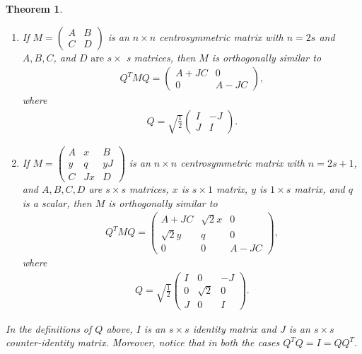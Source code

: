 \documentclass[12pt]{amsart}
\theoremstyle{plain}
\newtheorem{Thm}{Theorem}[section]
\theoremstyle{definition}
\begin{document}
\begin{Thm}\cite[Theorem 9]{weaver1985centrosymmetric}\label{orthogonal}
 \begin{enumerate}[label=(\alph*)]
     \item  If $M=\left(\begin{array}{ll}A & B \\ C & D\end{array}\right)$ is an $n \times n$ centrosymmetric matrix with $n=2s$ and $A, B, C$, and $D \text{ are } s\times$ s matrices, then $M$ is orthogonally similar to
     \begin{align*}
         Q^T M Q=\left(\begin{array}{cc}
    A+J C & 0 \\
    0 & A-J C
\end{array}\right),
     \end{align*}
     where 
     \begin{align*}
         Q  =  \sqrt{\frac{1}{2}}\left(\begin{array}{ll}I & -J \\ J & I\end{array}\right).
     \end{align*}

     \item If $M=\left(\begin{array}{lll}A & x & B \\ y & q & yJ \\ C & Jx & D\end{array}\right)$ is an $n \times n$ centrosymmetric matrix with $n =2s+1$, and $A, B, C, D$  are  $s \times s$ matrices, $x$ is $s \times 1$ matrix, $y$ is $1 \times s$ matrix, and $q$ is a scalar, then $M$ is orthogonally similar to
     \begin{align*}
         Q^{T} M Q=\left(\begin{array}{ccc}
			A+J C & \sqrt{2} x & 0 \\
			\sqrt{2} y & q & 0 \\
			0 & 0 & A-J C
		\end{array}\right),
     \end{align*}
		where
  \begin{align*}
      Q  =  \sqrt{\frac{1}{2}}\left(\begin{array}{lll} I & 0 & -J \\ 0 & \sqrt{2} & 0\\ J & 0 & I\end{array}\right).
  \end{align*}
 \end{enumerate}
  In the definitions of $Q$ above, $I$ is an $s\times s$ identity matrix and $J$ is an $s\times s$ counter-identity matrix. Moreover, notice that in both the cases $Q^{T}Q=I=QQ^{T}.$
\end{Thm}
\end{document}
